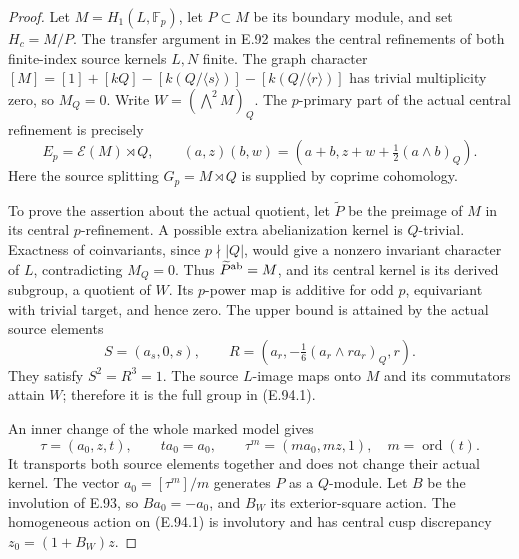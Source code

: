 \begin{proof}
Let \(M=H_1(L,\mathbb F_p)\), let
\(P\subset M\) be its boundary module, and set \(H_c=M/P\).
The transfer argument in E.92 makes the central refinements
of both finite-index source kernels \(L,N\) finite.
The graph character
\([M]=[1]+[kQ]-[k(Q/\langle s\rangle)]-[k(Q/\langle r\rangle)]\)
has trivial multiplicity zero, so \(M_Q=0\).
Write \(W=(\bigwedge^2M)_Q\).
The \(p\)-primary part of the actual central refinement is
precisely
\[
 E_p=\mathcal E(M)\rtimes Q,\qquad
 (a,z)(b,w)=(a+b,z+w+\tfrac12(a\wedge b)_Q).
                                                        \tag{E.94.1}
\]
Here the source splitting \(G_p=M\rtimes Q\) is supplied
by coprime cohomology.

To prove the assertion about the actual quotient, let
\(\widetilde P\) be the preimage of \(M\) in its central
\(p\)-refinement.  A possible extra abelianization kernel
is \(Q\)-trivial.  Exactness of coinvariants, since
\(p\nmid|Q|\), would give a nonzero invariant character
of \(L\), contradicting \(M_Q=0\).
Thus \(\widetilde P^{\rm ab}=M\), and its central kernel
is its derived subgroup, a quotient of \(W\).
Its \(p\)-power map is additive for odd \(p\), equivariant
with trivial target, and hence zero.
The upper bound is attained by the actual source elements
\[
 S=(a_s,0,s),\qquad
 R=(a_r,-\tfrac16(a_r\wedge ra_r)_Q,r).
                                                        \tag{E.94.2}
\]
They satisfy \(S^2=R^3=1\).
The source \(L\)-image maps onto \(M\) and its commutators
attain \(W\); therefore it is the full group in (E.94.1).

An inner change of the whole marked model gives
\[
 \tau=(a_0,z,t),\qquad ta_0=a_0,\qquad
 \tau^m=(ma_0,mz,1),\quad m=\operatorname{ord}(t).
                                                        \tag{E.94.3}
\]
It transports both source elements together and does not
change their actual kernel.  The vector \(a_0=[\tau^m]/m\)
generates \(P\) as a \(Q\)-module.
Let \(B\) be the involution of E.93, so \(Ba_0=-a_0\),
and \(B_W\) its exterior-square action.
The homogeneous action on (E.94.1) is involutory and has
central cusp discrepancy \(z_0=(1+B_W)z\).


\end{proof}
